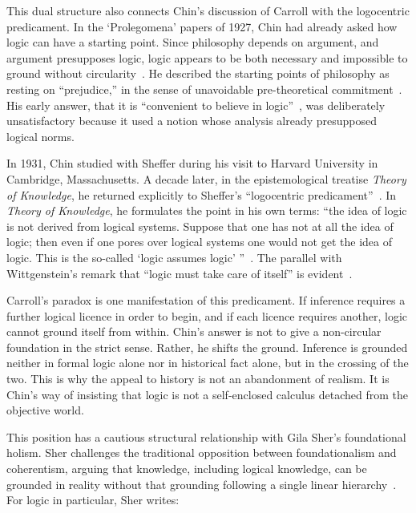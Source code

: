 \documentclass{birkjour}
\begin{document}
This dual structure also connects Chin's discussion of Carroll with the logocentric predicament. In the `Prolegomena' papers of 1927, Chin had already asked how logic can have a starting point. Since philosophy depends on argument, and argument presupposes logic, logic appears to be both necessary and impossible to ground without circularity~\cite[pp.~37--38]{Chin1927a}. He described the starting points of philosophy as resting on ``prejudice,'' in the sense of unavoidable pre-theoretical commitment~\cite[p.~28]{Chin1927a}. His early answer, that it is ``convenient to believe in logic''~\cite[p.~23]{Chin1927b}, was deliberately unsatisfactory because it used a notion whose analysis already presupposed logical norms.

In 1931, Chin studied with Sheffer during his visit to Harvard University in Cambridge, Massachusetts. A decade later, in the epistemological treatise \textit{Theory of Knowledge}, he returned explicitly to Sheffer's ``logocentric predicament''~\cite[vol.~5, pp.~21--22]{Jin2014}. In \textit{Theory of Knowledge}, he formulates the point in his own terms: ``the idea of logic is not derived from logical systems. Suppose that one has not at all the idea of logic; then even if one pores over logical systems one would not get the idea of logic. This is the so-called `logic assumes logic' ''~\cite[p.~574]{Jin1983}. The parallel with Wittgenstein's remark that ``logic must take care of itself'' is evident~\cite[props.~5.473--5.4731]{Wittgenstein1961}.

Carroll's paradox is one manifestation of this predicament. If inference requires a further logical licence in order to begin, and if each licence requires another, logic cannot ground itself from within. Chin's answer is not to give a non-circular foundation in the strict sense. Rather, he shifts the ground. Inference is grounded neither in formal logic alone nor in historical fact alone, but in the crossing of the two. This is why the appeal to history is not an abandonment of realism. It is Chin's way of insisting that logic is not a self-enclosed calculus detached from the objective world.

This position has a cautious structural relationship with Gila Sher's foundational holism. Sher challenges the traditional opposition between foundationalism and coherentism, arguing that knowledge, including logical knowledge, can be grounded in reality without that grounding following a single linear hierarchy~\cite[pp.~353--355]{Sher2011}. For logic in particular, Sher writes:
\end{document}
